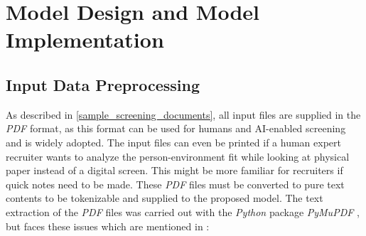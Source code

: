 \documentclass[draft,final]{thesisclass} %
\begin{document}
\section{Model Design and Model Implementation} \label{implementation}

\subsection{Input Data Preprocessing}
As described in \ref{sample_screening_documents}, all input files are supplied in the \textit{PDF} format, as this format can be used for humans and \acs{AI}-enabled screening and is widely adopted.
The input files can even be printed if a human expert recruiter wants to analyze the person-environment fit while looking at physical paper instead of a digital screen.
This might be more familiar for recruiters if quick notes need to be made.
These \textit{PDF} files must be converted to pure text contents to be tokenizable and supplied to the proposed model.
The text extraction of the \textit{PDF} files was carried out with the \textit{Python} package \textit{PyMuPDF} \parencite{pymupdf}, but faces these issues which are mentioned in \textcite{pymupdf}:
\end{document}
